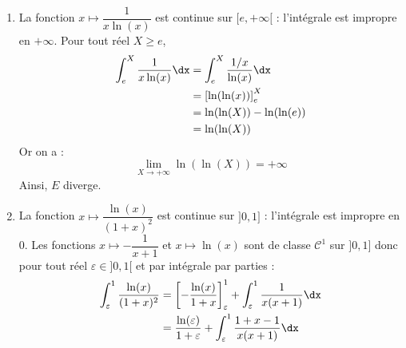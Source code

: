 \documentclass[a4paper,10pt]{report}
\begin{document}
\begin{enumerate}
$$ (x+1)-(x-1) = 2$$
Ainsi, pour tout réel $X \geq 2$,
\begin{align*}
\int_2^{X} \dfrac{1}{(x-1)(x+1)} \dx & = \dfrac{1}{2} \int_2^{X} \dfrac{(x+1)-(x-1)}{(x-1)(x+1)} \dx \\
& = \dfrac{1}{2} \int_2^{X} \dfrac{1}{(x-1)} - \dfrac{1}{x+1} \dx \\
& = \dfrac{1}{2} \left[ \ln(x-1)-\ln(x+1) \right]_2^X \\
& = \dfrac{1}{2} \left[ \ln \left( \dfrac{x-1}{x+1} \right) \right]_2^X \\
& = \dfrac{1}{2} \ln \left( \dfrac{X-1}{X+1} \right) - \dfrac{1}{2} \ln \left( \dfrac{1}{3} \right) \\
& =  \dfrac{1}{2} \ln \left( \dfrac{X-1}{X+1} \right) + \dfrac{\ln(3)}{2}  \\
\end{align*}
Par terme des plus hauts degrés, on sait que :
$$ \lim_{X \rightarrow + \infty}  \dfrac{X-1}{X+1} = 1$$
donc par continuité de la fonction logarithme népérien en $1$ :
$$  \lim_{X \rightarrow + \infty} \ln \left( \dfrac{X-1}{X+1} \right) = \ln(1) = 0$$
Ainsi,
$$ \lim_{X \rightarrow + \infty}  \dfrac{1}{2} \ln \left( \dfrac{X-1}{X+1} \right) + \dfrac{\ln(3)}{2}  = \dfrac{\ln(3)}{2}$$
Ainsi, $D$ converge et vaut $\dfrac{\ln(3)}{2} \cdot$
\item La fonction $x \mapsto \dfrac{1}{x\ln(x)}$ est continue sur $[e, + \infty[$ : l'intégrale est impropre en $+ \infty$. Pour tout réel $X \geq e$,
\begin{align*}
\int_{e}^{X} \dfrac{1}{x\ln(x)} \dx & = \int_{e}^{X} \dfrac{1/x}{\ln(x)} \dx \\
& = \left[ \ln(\ln(x)) \right]_e^X \\
& = \ln(\ln(X))- \ln(\ln(e)) \\
& = \ln(\ln(X))
\end{align*}
Or on a :
$$ \lim_{X \rightarrow + \infty} \ln(\ln(X)) = + \infty$$
Ainsi, $E$ diverge.
\item La fonction $x \mapsto \dfrac{\ln(x)}{(1+x)^2}$ est continue sur $]0,1]$ : l'intégrale est impropre en $0$. Les fonctions $x \mapsto - \dfrac{1}{x+1}$ et $x \mapsto \ln(x)$ sont de classe $\mathcal{C}^1$ sur $]0,1]$ donc pour tout réel $\varepsilon \in ]0,1[$ et par intégrale par parties :
\begin{align*}
\int_{\varepsilon}^1 \dfrac{\ln(x)}{(1+x)^2} & = \left[- \dfrac{\ln(x)}{1+x} \right]_{\varepsilon}^1 + \int_{\varepsilon}^1 \dfrac{1}{x(x+1)} \dx \\
& = \dfrac{\ln(\varepsilon)}{1+\varepsilon} +\int_{\varepsilon}^1 \dfrac{1+x-1}{x(x+1)} \dx \\

\end{align*}
\end{enumerate}
\end{document}
